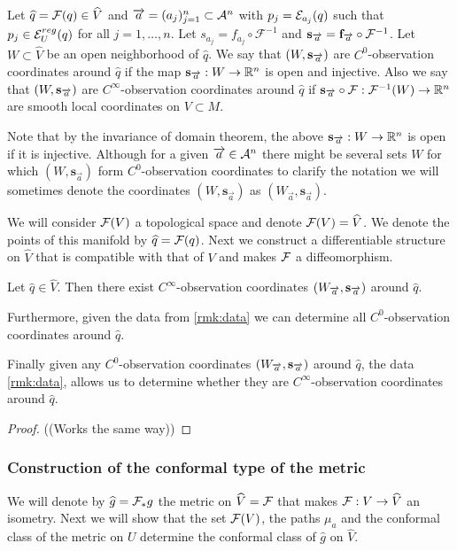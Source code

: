\begin{definition}
Let $\widehat{q}=\F(q)\in \widehat{V}$ and $\aa = (a_j)^n_{j=1}\subset \ca^n$ with $p_j = \mc{E}_{a_j}(q)$ such that $p_j\in \mc{E}_U^{reg}(q)$ for all $j=1,\dots,n$. Let $s_{a_j} = f_{a_j} \circ \mathcal{F}^{-1}$ and $\mathbf{s}_{\overrightarrow{a}}=\mathbf{f}_{\overrightarrow{a}}\circ\mc{F}^{-1}$. Let $W\subset\widehat{V}$ be an open neighborhood of $\widehat{q}$. We say that $(W,\mathbf{s}_\aa)$ are $C^0$-observation coordinates around $\widehat{q}$ if the map $\mathbf{s}_\aa:W\to \R^n$ is open and injective. Also we say that $(W,\mathbf{s}_\aa)$ are $C^\infty$-observation coordinates around $\widehat{q}$ if $\mathbf{s}_{\overrightarrow{a}}\circ\mc{F}:\mc{F}^{-1}(W)\to \R^n$ are smooth local coordinates on $V\subset M$.
\end{definition}
Note that by the invariance of domain theorem, the above $\mathbf{s}_{\overrightarrow{a}}:W\to \R^n$ is open if it is injective.
Although for a given $\overrightarrow{a}\in \ca^n$ there might be several sets $W$ for which $(W,\mathbf{s}_{\overrightarrow{a}})$ form $C^0$-observation coordinates to clarify the notation we will sometimes denote the coordinates $(W,\mathbf{s}_{\overrightarrow{a}})$ as $(W_{\overrightarrow{a}},\mathbf{s}_{\overrightarrow{a}})$. 

We will consider $\mc{F}(V)$ a topological space and denote $\mc{F}(V)=\widehat{V}$. We denote the points of this manifold by $\widehat{q}=\mc{F}(q)$. Next we construct a differentiable structure on $\widehat{V}$ that is compatible with that of $V$ and makes $\F$ a diffeomorphism.

\begin{proposition}\label{prop:findsmoothcoords}
Let  $\widehat{q}\in \widehat{V}$. 
Then there exist $C^\infty$-observation coordinates $(W_\aa,\mathbf{s}_\aa)$ around $\widehat{q}$.

Furthermore, given the data from \ref{rmk:data} we can determine all $C^0$-observation coordinates around $\widehat{q}$.

Finally given any $C^0$-observation coordinates $(W_\aa,\mathbf{s}_\aa)$ around $\widehat{q}$, the data \ref{rmk:data}, allows us to determine whether they are $C^\infty$-observation coordinates around $\widehat{q}$.
\end{proposition}
\begin{proof}
((Works the same way))
\end{proof}

\subsubsection{Construction of the conformal type of the metric}
We will denote by $\widehat{g}=\F_*g$ the metric on $\widehat{V}=\F$ that makes $\F:V\to \widehat{V}$ an isometry. Next we will show that the set $\F(V)$, the paths $\mu_a$ and the conformal class of the metric on $U$ determine the conformal class of $\widehat{g}$ on $\widehat{V}$.

